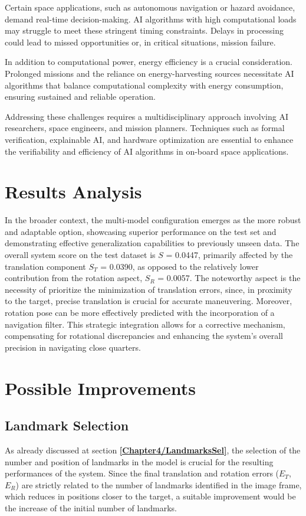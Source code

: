 Certain space applications, such as autonomous navigation or hazard avoidance, demand real-time decision-making. AI algorithms with high computational loads may struggle to meet these stringent timing constraints. Delays in processing could lead to missed opportunities or, in critical situations, mission failure.

In addition to computational power, energy efficiency is a crucial consideration. Prolonged missions and the reliance on energy-harvesting sources necessitate AI algorithms that balance computational complexity with energy consumption, ensuring sustained and reliable operation.

Addressing these challenges requires a multidisciplinary approach involving AI researchers, space engineers, and mission planners. Techniques such as formal verification, explainable AI, and hardware optimization are essential to enhance the verifiability and efficiency of AI algorithms in on-board space applications.

\section{Results Analysis}
In the broader context, the multi-model configuration emerges as the more robust and adaptable option, showcasing superior performance on the test set and demonstrating effective generalization capabilities to previously unseen data. The overall system score on the test dataset is $S$ = 0.0447, primarily affected by the translation component $S_T$ = 0.0390, as opposed to the relatively lower contribution from the rotation aspect, $S_R$ = 0.0057. The noteworthy aspect is the necessity of prioritize the minimization of translation errors, since, in proximity to the target, precise translation is crucial for accurate maneuvering.
Moreover, rotation pose can be more effectively predicted with the incorporation of a navigation filter. This strategic integration allows for a corrective mechanism, compensating for rotational discrepancies and enhancing the system's overall precision in navigating close quarters.

\section{Possible Improvements}
\label{Chapter6/Improv}
\subsection{Landmark Selection}
As already discussed at section \textbf{\ref{Chapter4/LandmarksSel}}, the selection of the number and position of landmarks in the model is crucial for the resulting performances of the system. Since the final translation and rotation errors ($E_T$, $E_R$) are strictly related to the number of landmarks identified in the image frame, which reduces in positions closer to the target, a suitable improvement would be the increase of the initial number of landmarks.

